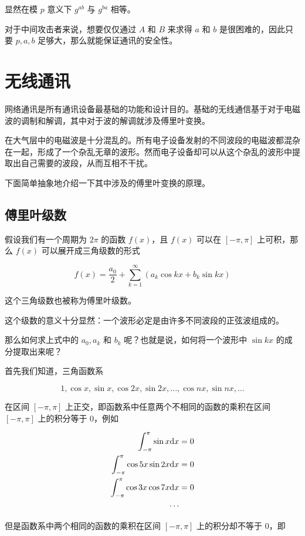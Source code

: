 \documentclass[hyperref,UTF8,12pt,a4paper]{ctexart}
\begin{document}
显然在模 $p$ 意义下 $g^{ab}$ 与 $g^{ba}$ 相等。

对于中间攻击者来说，想要仅仅通过 $A$ 和 $B$ 来求得 $a$ 和 $b$ 是很困难的，因此只要 $p,a,b$ 足够大，那么就能保证通讯的安全性。

\section{无线通讯}

网络通讯是所有通讯设备最基础的功能和设计目的。基础的无线通信基于对于电磁波的调制和解调，其中对于波的解调就涉及傅里叶变换。

在大气层中的电磁波是十分混乱的。所有电子设备发射的不同波段的电磁波都混杂在一起，形成了一个杂乱无章的波形。然而电子设备却可以从这个杂乱的波形中提取出自己需要的波段，从而互相不干扰。

下面简单抽象地介绍一下其中涉及的傅里叶变换的原理。

\subsection{傅里叶级数}

假设我们有一个周期为 $2\pi$ 的函数 $f(x)$，且 $f(x)$ 可以在 $[-\pi,\pi]$ 上可积，那么 $f(x)$ 可以展开成三角级数的形式

$$
f(x)=\frac{a_0}{2}+\sum_{k=1}^{\infty}(a_k\cos{kx}+b_k\sin{kx})
$$

这个三角级数也被称为傅里叶级数。

这个级数的意义十分显然：一个波形必定是由许多不同波段的正弦波组成的。

那么如何求上式中的 $a_0, a_k$ 和 $b_k$ 呢？也就是说，如何将一个波形中 $\sin{kx}$ 的成分提取出来呢？

首先我们知道，三角函数系

$$
1, \cos x, \sin x, \cos 2x, \sin 2x, ..., \cos nx, \sin nx, ...
$$

在区间 $[-\pi, \pi]$ 上正交，即函数系中任意两个不相同的函数的乘积在区间 $[-\pi, \pi]$ 上的积分等于 $0$，例如

$$
\begin{aligned}
\int_{-\pi}^{\pi}\sin x {\rm d} x &= 0 \\
\int_{-\pi}^{\pi}\cos 5x \sin 2x {\rm d} x &= 0 \\
\int_{-\pi}^{\pi}\cos 3x \cos 7x {\rm d} x &= 0 \\
\cdots &
\end{aligned}
$$

但是函数系中两个相同的函数的乘积在区间 $[-\pi, \pi]$ 上的积分却不等于 $0$，即
\end{document}
